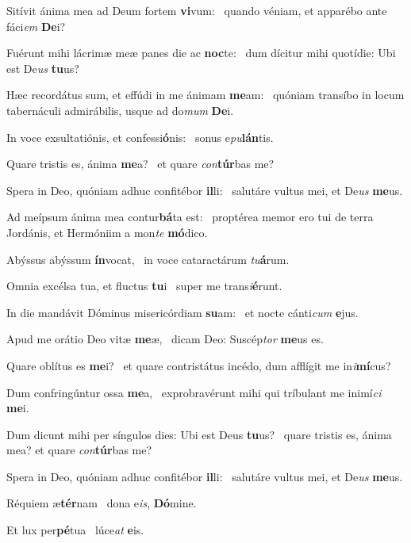 \item Sitívit ánima mea ad Deum fortem \textbf{vi}vum:~\psstar{} quando véniam, et apparébo ante fáci\textit{em} \textbf{De}i?

\item Fuérunt mihi lácrimæ meæ panes die ac \textbf{noc}te:~\psstar{} dum dícitur mihi quotídie: Ubi est De\textit{us} \textbf{tu}us?

\item Hæc recordátus sum, et effúdi in me ánimam \textbf{me}am:~\psstar{} quóniam transíbo in locum tabernáculi admirábilis, usque ad do\textit{mum} \textbf{De}i.

\item In voce exsultatiónis, et confessi\textbf{ó}nis:~\psstar{} sonus e\textit{pu}\textbf{lán}tis.

\item Quare tristis es, ánima \textbf{me}a?~\psstar{} et quare \textit{con}\textbf{túr}bas me?

\item Spera in Deo, quóniam adhuc confitébor \textbf{il}li:~\psstar{} salutáre vultus mei, et De\textit{us} \textbf{me}us.

\item Ad meípsum ánima mea contur\textbf{bá}ta est:~\psstar{} proptérea memor ero tui de terra Jordánis, et Hermóniim a mon\textit{te} \textbf{mó}dico.

\item Abýssus abýssum \textbf{ín}vocat,~\psstar{} in voce cataractárum \textit{tu}\textbf{á}rum.

\item Omnia excélsa tua, et fluctus \textbf{tu}i~\psstar{} super me trans\textit{i}\textbf{é}runt.

\item In die mandávit Dóminus misericórdiam \textbf{su}am:~\psstar{} et nocte cánti\textit{cum} \textbf{e}jus.

\item Apud me orátio Deo vitæ \textbf{me}æ,~\psstar{} dicam Deo: Suscép\textit{tor} \textbf{me}us es.

\item Quare oblítus es \textbf{me}i?~\psstar{} et quare contristátus incédo, dum afflígit me in\textit{i}\textbf{mí}cus?

\item Dum confringúntur ossa \textbf{me}a,~\psstar{} exprobravérunt mihi qui tríbulant me inimí\textit{ci} \textbf{me}i.

\item Dum dicunt mihi per síngulos dies: Ubi est Deus \textbf{tu}us?~\psstar{} quare tristis es, ánima mea? et quare \textit{con}\textbf{túr}bas me?

\item Spera in Deo, quóniam adhuc confitébor \textbf{il}li:~\psstar{} salutáre vultus mei, et De\textit{us} \textbf{me}us.

\item Réquiem æ\textbf{tér}nam~\psstar{} dona e\textit{is}, \textbf{Dó}mine.

\item Et lux per\textbf{pé}tua~\psstar{} lúce\textit{at} \textbf{e}is.